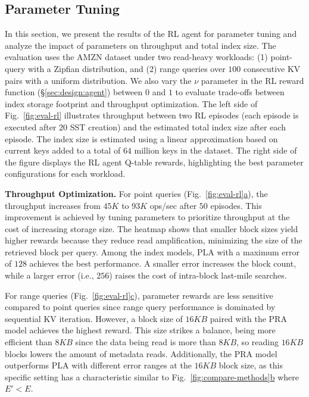 \subsection{Parameter Tuning}
\label{sec:eval:param}
\label{sec:exp:rl-agent-tuning}


In this section, we present the results of the RL agent for parameter tuning and analyze the impact of parameters on throughput and total index size. The evaluation uses the AMZN dataset under two read-heavy workloads: (1) point-query with a Zipfian distribution, and (2) range queries over $100$ consecutive KV pairs with a uniform distribution. We also vary the $\nu$ parameter in the RL reward function (\S\ref{sec:design:agent}) between $0$ and $1$ to evaluate trade-offs between index storage footprint and throughput optimization. The left side of Fig.~\hyperref[fig:eval-rl]{\ref*{fig:eval-rl}} illustrates throughput between two RL episodes (each episode is executed after $20$ SST creation) and the estimated total index size after each episode. The index size is estimated using a linear approximation based on current keys added to a total of $64$ million keys in the dataset. The right side of the figure displays the RL agent Q-table rewards, highlighting the best parameter configurations for each workload.

\noindent
\textbf{Throughput Optimization.} For point queries (Fig.~\hyperref[fig:eval-rl]{\ref*{fig:eval-rl}a}), the throughput increases from $45K$ to $93K$ ops/sec after $50$ episodes. This improvement is achieved by tuning parameters to prioritize throughput at the cost of increasing storage size. The heatmap shows that smaller block sizes yield higher rewards because they reduce read amplification, minimizing the size of the retrieved block per query. Among the index models, PLA with a maximum error of $128$ achieves the best performance. A smaller error increases the block count, while a larger error (i.e., $256$) raises the cost of intra-block last-mile searches.

For range queries (Fig.~\hyperref[fig:eval-rl]{\ref*{fig:eval-rl}c}), parameter rewards are less sensitive compared to point queries since range query performance is dominated by sequential KV iteration. However, a block size of $16KB$ paired with the PRA model achieves the highest reward. This size strikes a balance, being more efficient than $8KB$ since the data being read is more than $8KB$, so reading $16KB$ blocks lowers the amount of metadata reads. Additionally, the PRA model outperforms PLA with different error ranges at the $16KB$ block size, as this specific setting has a characteristic similar to Fig.~\hyperref[fig:compare-methods]{\ref*{fig:compare-methods}b} where $E' < E$.

